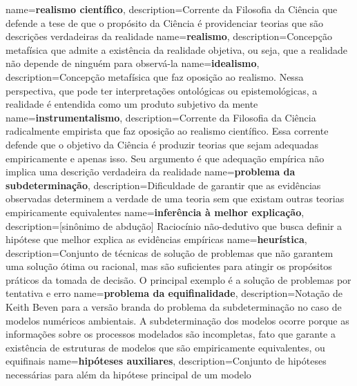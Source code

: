 {
    name=\textbf{realismo científico},
    description={Corrente da Filosofia da Ciência que defende a tese de que o propósito da Ciência é providenciar teorias que são descrições verdadeiras da realidade}
}
{
    name=\textbf{realismo},
    description={Concepção metafísica que admite a existência da realidade objetiva, ou seja, que a realidade não depende de ninguém para observá-la}
}
{
    name=\textbf{idealismo},
    description={Concepção metafísica que faz oposição ao realismo. Nessa perspectiva, que pode ter interpretações ontológicas ou epistemológicas, a realidade é entendida como um produto subjetivo da mente}
}
{
    name=\textbf{instrumentalismo},
    description={Corrente da Filosofia da Ciência radicalmente empirista que faz oposição ao realismo científico. Essa corrente defende que o objetivo da Ciência é produzir teorias que sejam adequadas empiricamente e apenas isso. Seu argumento é que adequação empírica não implica uma descrição verdadeira da realidade}
}
{
    name=\textbf{problema da subdeterminação},
    description={Dificuldade de garantir que as evidências observadas determinem a verdade de uma teoria sem que existam outras teorias empiricamente equivalentes}
}
{
    name=\textbf{inferência à melhor explicação},
    description={[sinônimo de abdução] Raciocínio não-dedutivo que busca definir a hipótese que melhor explica as evidências empíricas}
}
{
    name=\textbf{heurística},
    description={Conjunto de técnicas de solução de problemas que não garantem uma solução ótima ou racional, mas são suficientes para atingir os propósitos práticos da tomada de decisão. O principal exemplo é a solução de problemas por tentativa e erro}
}
{
    name=\textbf{problema da equifinalidade},
    description={Notação de Keith Beven para a versão branda do problema da subdeterminação no caso de modelos numéricos ambientais. A subdeterminação dos modelos ocorre porque as informações sobre os processos modelados são incompletas, fato que garante a existência de estruturas de modelos que são empiricamente equivalentes, ou equifinais}
}
{
    name=\textbf{hipóteses auxiliares},
    description={Conjunto de hipóteses necessárias para além da hipótese principal de um modelo}
}
